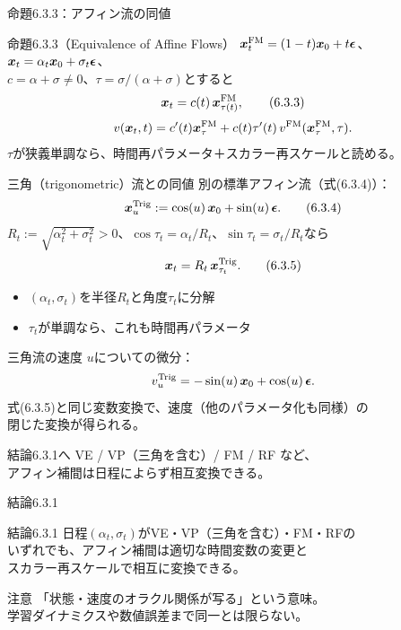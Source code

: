 \asmain
\begin{frame}{命題6.3.3：アフィン流の同値}
    \begin{block}{命題6.3.3（Equivalence of Affine Flows）}
        $\bm{x}_t^{\mathrm{FM}}=(1-t)\bm{x}_0+t\bm{\epsilon}$、$\bm{x}_t=\alpha_t\bm{x}_0+\sigma_t\bm{\epsilon}$、\\
        $c=\alpha+\sigma\neq 0$、$\tau=\sigma/(\alpha+\sigma)$とすると
        \[
            \bm{x}_t = c(t)\,\bm{x}_{\tau(t)}^{\mathrm{FM}},
            \tag{6.3.3}
        \]
        \[
            v(\bm{x}_t,t)
            =
            c'(t)\bm{x}_{\tau}^{\mathrm{FM}}
            +
            c(t)\tau'(t)\,
            v^{\mathrm{FM}}(\bm{x}_{\tau}^{\mathrm{FM}},\tau).
        \]
        $\tau$が狭義単調なら、時間再パラメータ＋スカラー再スケールと読める。
    \end{block}
\end{frame}
\asmain
\begin{frame}{三角（trigonometric）流との同値}
    別の標準アフィン流（式(6.3.4)）：
    \[
        \bm{x}_u^{\mathrm{Trig}}
        :=
        \cos(u)\,\bm{x}_0 + \sin(u)\,\bm{\epsilon}.
        \tag{6.3.4}
    \]
    $R_t:=\sqrt{\alpha_t^{2}+\sigma_t^{2}}>0$、$\cos\tau_t=\alpha_t/R_t$、$\sin\tau_t=\sigma_t/R_t$なら
    \[
        \bm{x}_t
        =
        R_t\,\bm{x}_{\tau_t}^{\mathrm{Trig}}.
        \tag{6.3.5}
    \]
    \begin{itemize}
        \item $(\alpha_t,\sigma_t)$を半径$R_t$と角度$\tau_t$に分解
        \item $\tau_t$が単調なら、これも時間再パラメータ
    \end{itemize}
\end{frame}
\asmain
\begin{frame}{三角流の速度}
    $u$についての微分：
    \[
        v_u^{\mathrm{Trig}}
        =
        -\sin(u)\,\bm{x}_0 + \cos(u)\,\bm{\epsilon}.
    \]
    式(6.3.5)と同じ変数変換で、速度（他のパラメータ化も同様）の\\
    閉じた変換が得られる。
    \begin{block}{結論6.3.1へ}
        VE / VP（三角を含む）/ FM / RF など、\\
        アフィン補間は日程によらず相互変換できる。
    \end{block}
\end{frame}
\asmain
\begin{frame}{結論6.3.1}
    \begin{block}{結論6.3.1}
        日程$(\alpha_t,\sigma_t)$がVE・VP（三角を含む）・FM・RFの\\
        いずれでも、アフィン補間は適切な時間変数の変更と\\
        スカラー再スケールで相互に変換できる。
    \end{block}
    \begin{exampleblock}{注意}
        「状態・速度のオラクル関係が写る」という意味。\\
        学習ダイナミクスや数値誤差まで同一とは限らない。
    \end{exampleblock}
\end{frame}
